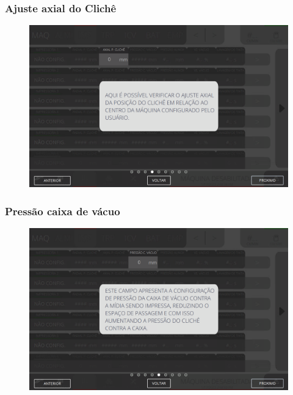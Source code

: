 \newpage
\thispagestyle{fancy}
\vspace*{40 pt}
\subsubsection{\small{Ajuste axial do Clichê}} \label{sec:telaAjustesImpressorasAjusteAxialCliche}
\vspace*{\fill}
\begin{figure}[h]
    \centering
    \includegraphics[width=576 px,height=360 px]{src/imagesICV/04-printters/01-printters/settings/4.png}
\end{figure}
\vspace*{\fill}

\newpage
\thispagestyle{fancy}
\vspace*{40 pt}
\subsubsection{\small{Pressão caixa de vácuo}} \label{sec:telaAjustesImpressorasPressaoCaixaVaco}
\vspace*{\fill}
\begin{figure}[h]
    \centering
    \includegraphics[width=576 px,height=360 px]{src/imagesICV/04-printters/01-printters/settings/5.png}
\end{figure}
\vspace*{\fill}

